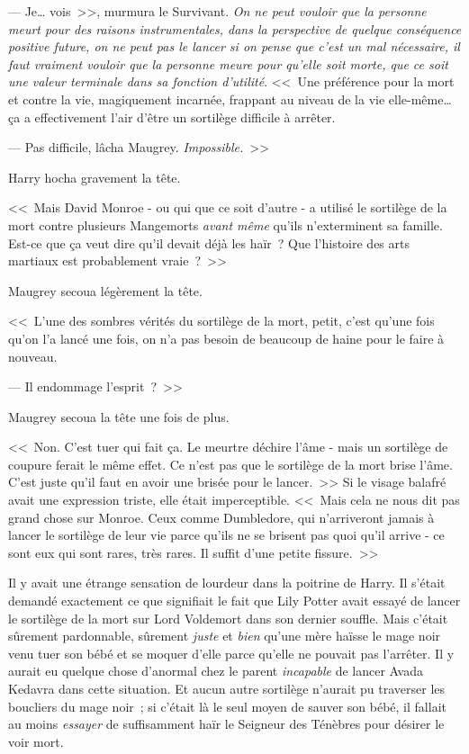 --- Je… vois~>>, murmura le Survivant. \emph{On ne peut vouloir que la personne meurt pour des raisons instrumentales, dans la perspective de quelque conséquence positive future, on ne peut pas le lancer si on pense que c'est un mal nécessaire, il faut vraiment vouloir que la personne meure pour qu'elle soit morte, que ce soit une valeur terminale dans sa fonction d'utilité}. <<~Une préférence pour la mort et contre la vie, magiquement incarnée, frappant au niveau de la vie elle-même… ça a effectivement l'air d'être un sortilège difficile à arrêter.

--- Pas difficile, lâcha Maugrey. \emph{Impossible.}~>>

Harry hocha gravement la tête.

<<~Mais David Monroe - ou qui que ce soit d'autre - a utilisé le sortilège de la mort contre plusieurs Mangemorts \emph{avant même} qu'ils n'exterminent sa famille. Est-ce que ça veut dire qu'il devait déjà les haïr~? Que l'histoire des arts martiaux est probablement vraie~?~>>

Maugrey secoua légèrement la tête.

<<~L'une des sombres vérités du sortilège de la mort, petit, c'est qu'une fois qu'on l'a lancé une fois, on n'a pas besoin de beaucoup de haine pour le faire à nouveau.

--- Il endommage l'esprit~?~>>

Maugrey secoua la tête une fois de plus.

<<~Non. C'est tuer qui fait ça. Le meurtre déchire l'âme - mais un sortilège de coupure ferait le même effet. Ce n'est pas que le sortilège de la mort brise l'âme. C'est juste qu'il faut en avoir une brisée pour le lancer.~>> Si le visage balafré avait une expression triste, elle était imperceptible. <<~Mais cela ne nous dit pas grand chose sur Monroe. Ceux comme Dumbledore, qui n'arriveront jamais à lancer le sortilège de leur vie parce qu'ils ne se brisent pas quoi qu'il arrive - ce sont eux qui sont rares, très rares. Il suffit d'une petite fissure.~>>

Il y avait une étrange sensation de lourdeur dans la poitrine de Harry. Il s'était demandé exactement ce que signifiait le fait que Lily Potter avait essayé de lancer le sortilège de la mort sur Lord Voldemort dans son dernier souffle. Mais c'était sûrement pardonnable, sûrement \emph{juste} et \emph{bien} qu'une mère haïsse le mage noir venu tuer son bébé et se moquer d'elle parce qu'elle ne pouvait pas l'arrêter. Il y aurait eu quelque chose d'anormal chez le parent \emph{incapable} de lancer Avada Kedavra dans cette situation. Et aucun autre sortilège n'aurait pu traverser les boucliers du mage noir~; si c'était là le seul moyen de sauver son bébé, il fallait au moins \emph{essayer} de suffisamment haïr le Seigneur des Ténèbres pour désirer le voir mort.

